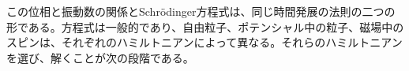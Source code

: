 \begin{classroomqa}
\end{classroomqa}

この位相と振動数の関係とSchr\"odinger方程式は、同じ時間発展の法則の二つの形である。方程式は一般的であり、自由粒子、ポテンシャル中の粒子、磁場中のスピンは、それぞれのハミルトニアンによって異なる。それらのハミルトニアンを選び、解くことが次の段階である。
